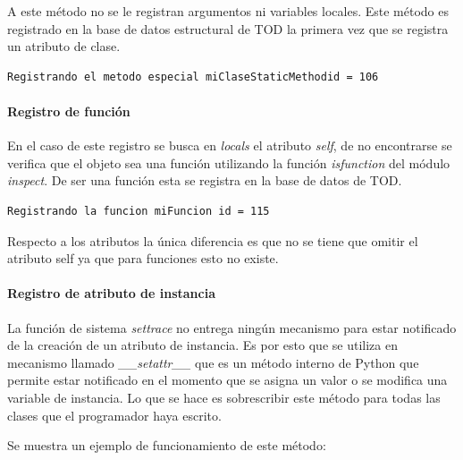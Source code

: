 \documentclass[12pt,legalpaper]{report}
\begin{document}
A este método no se le registran argumentos ni variables locales.  Este método es registrado en la base de datos estructural de TOD la primera vez que se registra un atributo de clase.

\begin{singlespace}
\begin{lstlisting}[style=consola,numbers=none]
Registrando el metodo especial miClaseStaticMethodid = 106
\end{lstlisting}
\end{singlespace}

				
				\paragraph{Registro de función}
				
En el caso de este registro se busca en \textit{locals} el atributo \textit{self}, de no encontrarse se verifica que el objeto sea una función utilizando la función \textit{isfunction} del módulo \textit{inspect}.  De ser una función esta se registra en la base de datos de TOD.			

\begin{singlespace}
\begin{lstlisting}[style=consola,numbers=none]
Registrando la funcion miFuncion id = 115
\end{lstlisting}
\end{singlespace}

Respecto a los atributos la única diferencia es que no se tiene que omitir el atributo self ya que para funciones esto no existe.


				\paragraph{Registro de atributo de instancia\label{registerField}}

La función de sistema \textit{settrace} no entrega ningún mecanismo para estar notificado de la creación de un atributo de instancia.  Es por esto que se utiliza en mecanismo llamado \textit{\_\_setattr\_\_} que es un método interno de Python \cite{setattr} que permite estar notificado en el momento que se asigna un valor o se modifica una variable de instancia.  Lo que se hace es sobrescribir este método para todas las clases que el programador haya escrito.

Se muestra un ejemplo de funcionamiento de este método:
\end{document}
